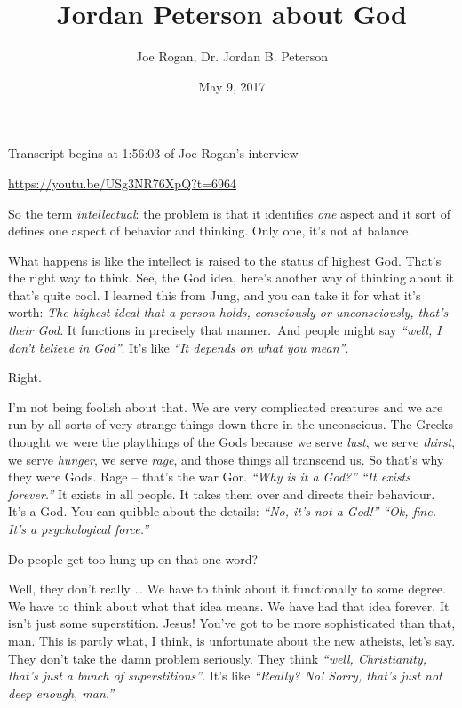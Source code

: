 \documentclass{memoir}
\title{Jordan Peterson about God}
\author{Joe Rogan, Dr. Jordan B. Peterson}
\date{May 9, 2017}
\newcommand{\qq}[1]{\emph{“#1”}}
\begin{document}
\maketitle{}

Transcript begins at 1:56:03 of Joe Rogan's interview

\url{https://youtu.be/USg3NR76XpQ?t=6964}


\begin{drama}

\jrspeaks So the term \emph{intellectual}: the problem is that it identifies \emph{one} aspect and it sort of defines one aspect of behavior and thinking. Only one, it’s not at balance.

\jpspeaks What happens is like the intellect is raised to the status of highest God. That’s the right way to think. See, the God idea, here’s another way of thinking about it that’s quite cool. I learned this from Jung, and you can take it for what it’s worth: \emph{The highest ideal that a person holds, consciously or unconsciously, that’s their God.} It functions in precisely that manner. And people might say \qq{well, I don’t believe in God}. It’s like \qq{It depends on what you mean}.

\jrspeaks Right.

\jpspeaks I’m not being foolish about that. We are very complicated creatures and we are run by all sorts of very strange things down there in the unconscious. The Greeks thought we were the playthings of the Gods because we serve \emph{lust}, we serve \emph{thirst}, we serve \emph{hunger}, we serve \emph{rage}, and those things all transcend us. So that’s why they were Gods. Rage -- that’s the war Gor. \qq{Why is it a God?} \qq{It exists forever.} It exists in all people. It takes them over and directs their behaviour. It’s a God. You can quibble about the details: \qq{No, it’s not a God!} \qq{Ok, fine. It’s a psychological force.}

\jrspeaks Do people get too hung up on that one word?

\jpspeaks Well, they don’t really \ldots{} We have to think about it functionally to some degree. We have to think about what that idea means. We have had that idea forever. It isn’t just some superstition. Jesus! You’ve got to be more sophisticated than that, man. This is partly what, I think, is unfortunate about the new atheists, let’s say. They don’t take the damn problem seriously. They think \qq{well, Christianity, that’s just a bunch of superstitions}. It’s like \qq{Really? No! Sorry, that’s just not deep enough, man.}


\end{drama}
\end{document}
